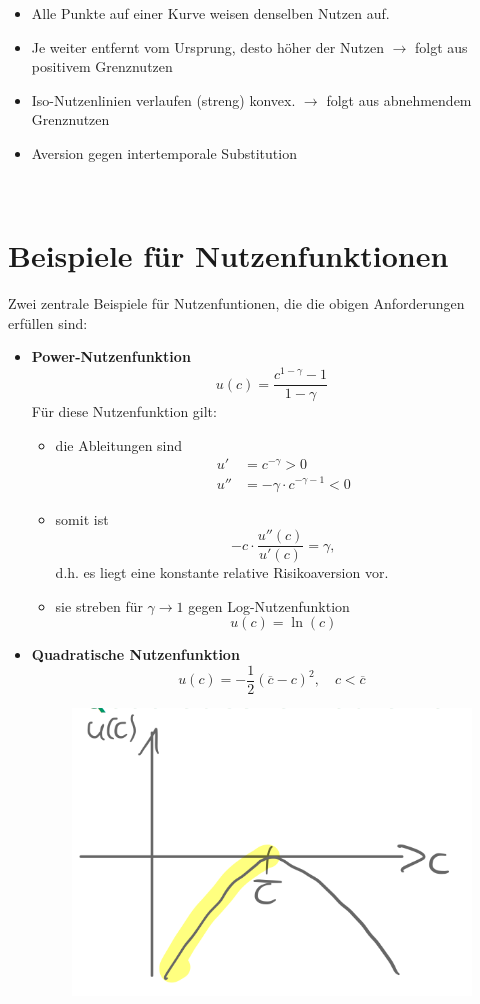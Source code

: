 \documentclass[12pt]{extreport} %
\theoremstyle{named}
\theoremstyle{nnamed}
\theoremstyle{itshape}
\theoremstyle{normal}
\begin{document}
\begin{itemize}
	\item Alle Punkte auf einer Kurve weisen denselben Nutzen auf.
	\item Je weiter entfernt vom Ursprung, desto höher der Nutzen $\rightarrow$ folgt aus positivem Grenznutzen
	\item Iso-Nutzenlinien verlaufen (streng) konvex. $\rightarrow$ folgt aus abnehmendem Grenznutzen
	\item Aversion gegen intertemporale Substitution
\end{itemize}

~\newpage

\section{Beispiele für Nutzenfunktionen}
Zwei zentrale Beispiele für Nutzenfuntionen, die die obigen Anforderungen erfüllen sind:
\begin{itemize}
	\item \textbf{Power-Nutzenfunktion}
			$$ u(c) = \frac{c^{1-\gamma} - 1}{1 - \gamma} $$
			Für diese Nutzenfunktion gilt:
		\begin{itemize}
			\item die Ableitungen sind
				\begin{align*}
					u' & = c^{-\gamma} > 0 \\
					u'' & = - \gamma \cdot c ^{-\gamma - 1} < 0
				\end{align*}
			\item somit ist
				$$- c \cdot \frac{u''(c)}{u'(c)} = \gamma, $$
				d.h. es liegt eine konstante relative Risikoaversion vor.
			\item sie streben für $\gamma \rightarrow 1$ gegen Log-Nutzenfunktion
		$$ u(c) = \ln(c) $$
		\end{itemize}
	\item \textbf{Quadratische Nutzenfunktion}
			$$ u(c) = - \frac{1}{2} \left( \overline{c} - c \right)^2, \quad c < \overline{c} $$
			\begin{figure}[h!] \centering
				\includegraphics[scale=0.4]{img/p20}
			\end{figure}
\end{itemize}
\end{document}
